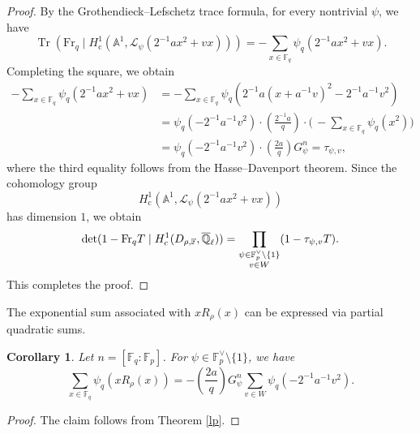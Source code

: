 \documentclass[12pt,a4paper]{amsart}
\newtheorem{corollary}[theorem]{Corollary}
\theoremstyle{definition}
\def\A{{\mathbb A}}
\def\F{{\mathbb F}}
\def\Ql{\overline{\mathbb{Q}}_\ell}
\theoremstyle{remark}
\DeclareMathOperator{\Tr}{Tr}
\begin{document}
\begin{proof}
By the Grothendieck--Lefschetz trace formula, for every nontrivial $\psi$, we have 
\[
 \Tr(\mathrm{Fr}_q \mid H^1_{\mathrm{c}}(\A^1,\mathcal{L}_\psi(2^{-1}ax^2+vx)))=-\sum_{x\in\F_q}\psi_q(2^{-1}ax^2+vx). 
\]
Completing the square, we obtain 
\begin{align*}
 -\sum_{x\in\F_q}\psi_q(2^{-1}ax^2+vx)&=-\sum_{x\in\F_q}\psi_q(2^{-1}a(x+a^{-1}v)^2-2^{-1}a^{-1}v^2)\\
&=\psi_q(-2^{-1}a^{-1}v^2) \cdot \left(\frac{2^{-1}a}{q}\right) \cdot \biggl(\,-\sum_{x \in \F_q} \psi_q(x^2)\biggr) \\
&=\psi_q(-2^{-1}a^{-1}v^2) \cdot \left(\frac{2a}{q}\right)G_{\psi}^n=\tau_{\psi,v},  
\end{align*}
where the third equality follows from 
the Hasse--Davenport theorem. 
Since the cohomology group
\[
H^1_{\mathrm{c}}(\A^1,\mathcal{L}_\psi(2^{-1}ax^2+vx))\] has dimension $1$, we obtain 
\[
\det(1-{\rm Fr}_q T\mid H^1_{\mathrm{c}}(D_{\rho,\F},\Ql))=\prod_{\substack{\psi\in\F_p^\vee\setminus\{1\} \\ v\in W}} (1-\tau_{\psi,v} T). 
\]
This completes the proof.  
\end{proof}

The exponential sum associated with $x R_\rho(x)$ 
can be expressed via partial quadratic sums. 
\begin{corollary}\label{expsum}
Let $n=[\F_q:\F_p]$. 
For $\psi \in \F_p^{\vee} \setminus \{1\}$, we have 
\[
\sum_{x \in \F_q} \psi_q(x R_\rho(x))=-\left(\frac{2a}{q}\right) 
G_{\psi}^n
\sum_{v\in W}\psi_q(-2^{-1}a^{-1}v^2). 
\]
\end{corollary}
\begin{proof}
The claim follows from Theorem \ref{lp}. 
\end{proof}
\end{document}
